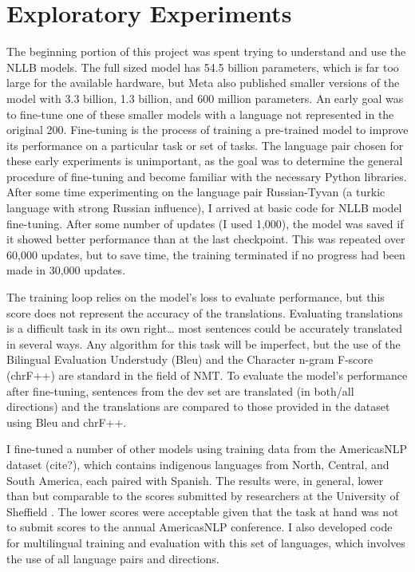 \section{Exploratory Experiments}

The beginning portion of this project was spent trying to understand and use the NLLB models. The full sized model has 54.5 billion parameters, which is far too large for the available hardware, but Meta also published smaller versions of the model with 3.3 billion, 1.3 billion, and 600 million parameters. An early goal was to fine-tune one of these smaller models with a language not represented in the original 200. Fine-tuning is the process of training a pre-trained model to improve its performance on a particular task or set of tasks. The language pair chosen for these early experiments is unimportant, as the goal was to determine the general procedure of fine-tuning and become familiar with the necessary Python libraries. After some time experimenting on the language pair Russian-Tyvan (a turkic language with strong Russian influence), I arrived at basic code for NLLB model fine-tuning. After some number of updates (I used 1,000), the model was saved if it showed better performance than at the last checkpoint. This was repeated over 60,000 updates, but to save time, the training terminated if no progress had been made in 30,000 updates.

The training loop relies on the model's loss to evaluate performance, but this score does not represent the accuracy of the translations. Evaluating translations is a difficult task in its own right… most sentences could be accurately translated in several ways. Any algorithm for this task will be imperfect, but the use of the Bilingual Evaluation Understudy (Bleu) and the Character n-gram F-score (chrF++) are standard in the field of NMT. To evaluate the model’s performance after fine-tuning, sentences from the dev set are translated (in both/all directions) and the translations are compared to those provided in the dataset using Bleu and chrF++. 

I fine-tuned a number of other models using training data from the AmericasNLP dataset (cite?), which contains indigenous languages from North, Central, and South America, each paired with Spanish. The results were, in general, lower than but comparable to the scores submitted by researchers at the University of Sheffield \cite{gow2023sheffield}. The lower scores were acceptable given that the task at hand was not to submit scores to the annual AmericasNLP conference. I also developed code for multilingual training and evaluation with this set of languages, which involves the use of all language pairs and directions. 

